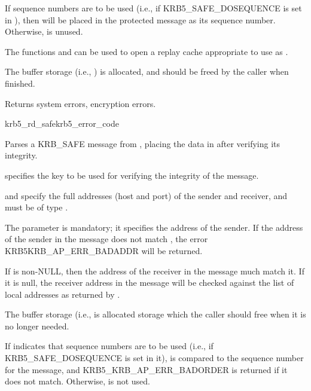 If sequence numbers are to be used (i.e., if KRB5_SAFE_DOSEQUENCE is
set in ), then  will be
placed in the protected message as its sequence number.  Otherwise,
 is unused.

The functions  and
 can be used to open a replay cache
appropriate to use as .

The  buffer storage (i.e.,
) is allocated, and should be freed by
the caller when finished.

Returns system errors, encryption errors.

\begin{funcdecl}{krb5_rd_safe}{krb5_error_code}{\funcin}
\funcinout
{}
\funcout
{}
\end{funcdecl}

Parses a KRB_SAFE message from , placing the
data in  after verifying its integrity.

 specifies the key to be used for verifying the
integrity of the message.
 
 and  specify the full
addresses (host and port) of the sender and receiver, and must be of
type .  

The  parameter is mandatory; it
specifies the address of the sender.  If the address of the sender in
the message does not match , the error
KRB5KRB_AP_ERR_BADADDR will be returned.

If  is non-NULL, then the address of the receiver
in the message much match it.  If it is null, the receiver address in
the message will be checked against the list of local addresses as
returned by .

The  buffer storage (i.e.,
 is allocated storage which the caller
should free when it is no longer needed.

If  indicates that sequence numbers are to be
used (i.e., if KRB5_SAFE_DOSEQUENCE is set in it),
 is compared to the sequence number for the
message, and KRB5_KRB_AP_ERR_BADORDER is returned if it does not
match.  Otherwise,  is not used.

